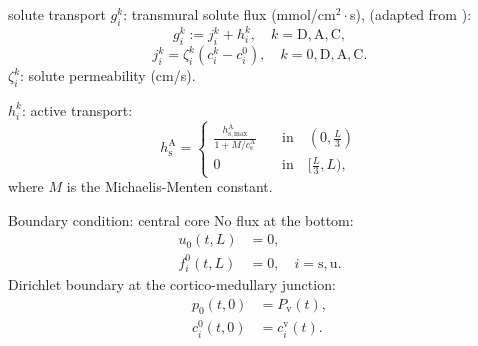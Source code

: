 \documentclass{beamer}
\begin{document}
\begin{frame}{solute transport}
    $g_i^k$: transmural solute flux (mmol/$\text{cm}^2\cdot$s), (adapted from \cite{Stephenson1987,Stephenson1989}):
    \begin{equation}
        g_i^k := j_i^k+h_i^k,\quad k=\mathrm{D},\mathrm{A},\mathrm{C},
    \end{equation}
    \begin{equation}
        j_i^k = \zeta_i^k\left( c_i^k - c_i^0 \right),\quad k=0,\mathrm{D},\mathrm{A},\mathrm{C}.
    \end{equation}
    $\zeta_i^k$: solute permeability (cm/s).

    $h_i^k$: active transport:
    \begin{equation}
        h_\mathrm{s}^\mathrm{A} = \begin{cases}
            \frac{{h}_\mathrm{s,max}^\mathrm{A}}{1+{M}/{c}_\mathrm{s}^\mathrm{A}}\quad &\text{in}\quad (0,\frac{L}{3})\\
            0\quad &\text{in}\quad [\frac{L}{3},L),
        \end{cases}
    \end{equation}
    where $M$ is the Michaelis-Menten constant.
\end{frame}

\begin{frame}{Boundary condition: central core}
    No flux at the bottom:
    \begin{align}
        u_0(t,L) &= 0,\\ 
        f_i^0(t,L)&=0,\quad i=\mathrm{s},\mathrm{u}.
    \end{align}
    Dirichlet boundary at the cortico-medullary junction:
    \begin{align}
        p_0(t,0) &= P_\mathrm{v}(t),\\ 
        c_i^0(t,0) &= c_i^\mathrm{v}(t).
    \end{align}
\end{frame}
\end{document}

